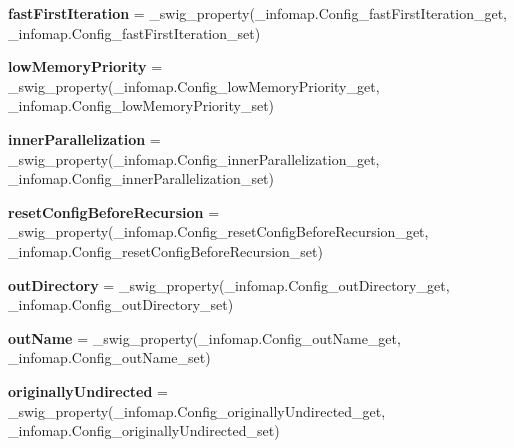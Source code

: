 \begin{DoxyCompactItemize}
{\bfseries fast\+First\+Iteration} = \+\_\+swig\+\_\+property(\+\_\+infomap.\+Config\+\_\+fast\+First\+Iteration\+\_\+get, \+\_\+infomap.\+Config\+\_\+fast\+First\+Iteration\+\_\+set)
\item 
\mbox{\label{classdsmacc_1_1graph_1_1infomap_1_1Config_a734e40e2bea0c9e3db42cc1677ef5a4b}} 
{\bfseries low\+Memory\+Priority} = \+\_\+swig\+\_\+property(\+\_\+infomap.\+Config\+\_\+low\+Memory\+Priority\+\_\+get, \+\_\+infomap.\+Config\+\_\+low\+Memory\+Priority\+\_\+set)
\item 
\mbox{\label{classdsmacc_1_1graph_1_1infomap_1_1Config_ae8d0b1f6167153bd74399a1c296420d4}} 
{\bfseries inner\+Parallelization} = \+\_\+swig\+\_\+property(\+\_\+infomap.\+Config\+\_\+inner\+Parallelization\+\_\+get, \+\_\+infomap.\+Config\+\_\+inner\+Parallelization\+\_\+set)
\item 
\mbox{\label{classdsmacc_1_1graph_1_1infomap_1_1Config_a5d00dea383ee391d4cef7983689e18cb}} 
{\bfseries reset\+Config\+Before\+Recursion} = \+\_\+swig\+\_\+property(\+\_\+infomap.\+Config\+\_\+reset\+Config\+Before\+Recursion\+\_\+get, \+\_\+infomap.\+Config\+\_\+reset\+Config\+Before\+Recursion\+\_\+set)
\item 
\mbox{\label{classdsmacc_1_1graph_1_1infomap_1_1Config_a98b900920c5cb5d55456003aef3e231f}} 
{\bfseries out\+Directory} = \+\_\+swig\+\_\+property(\+\_\+infomap.\+Config\+\_\+out\+Directory\+\_\+get, \+\_\+infomap.\+Config\+\_\+out\+Directory\+\_\+set)
\item 
\mbox{\label{classdsmacc_1_1graph_1_1infomap_1_1Config_a9e8142782a6fe253ec5ce252496f4560}} 
{\bfseries out\+Name} = \+\_\+swig\+\_\+property(\+\_\+infomap.\+Config\+\_\+out\+Name\+\_\+get, \+\_\+infomap.\+Config\+\_\+out\+Name\+\_\+set)
\item 
\mbox{\label{classdsmacc_1_1graph_1_1infomap_1_1Config_a626e70eef5afe5c2cadaaafb9a80abad}} 
{\bfseries originally\+Undirected} = \+\_\+swig\+\_\+property(\+\_\+infomap.\+Config\+\_\+originally\+Undirected\+\_\+get, \+\_\+infomap.\+Config\+\_\+originally\+Undirected\+\_\+set)

\end{DoxyCompactItemize}
